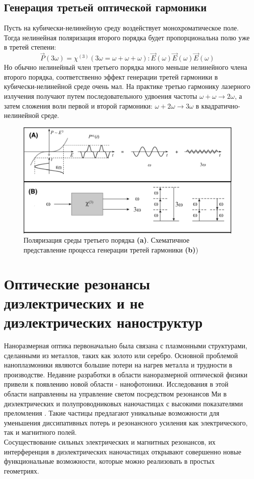 \subsection*{Генерация третьей оптической гармоники} 
Пусть на кубически-нелинейную среду воздействует монохроматическое поле. Тогда нелинейная поляризация второго порядка будет пропорциональна полю уже в третей степени:
\begin{equation}\label{thg2}
\vec{P}(3\omega) = \chi^{(3)}(3\omega = \omega + \omega + \omega):\vec{E}(\omega)\vec{E} (\omega)\vec{E} (\omega)
\end{equation}
Но обычно нелинейный член третьего порядка много меньше нелинейного члена второго порядка, соответственно  эффект генерации третей гармоники в кубически-нелинейной среде очень мал. На практике третью гармонику лазерного излучения получают путем последовательного удвоения частоты $\omega +  \omega \rightarrow 2\omega$, а затем сложения волн первой и второй гармоники: $\omega +  2\omega \rightarrow 3\omega$ в квадратично-нелинейной среде.
\begin{figure}[h]
	\centering
	\includegraphics[width=0.4\linewidth]{images/thg.png}
	\caption{Поляризация среды третьего порядка \textbf{(a)}. Схематичное представление процесса генерации третей гармоники \textbf{(b)}) \cite{mifi2015}}
	\label{thg12}
\end{figure}

\section{Оптические резонансы диэлектрических и не диэлектрических наноструктур}
\hspace*{2mm}
Наноразмерная оптика первоначально была связана с плазмонными структурами, сделанными из металлов, таких как золото или серебро. Основной проблемой наноплазмоники являются большие потери на нагрев металла и трудности в производстве. Недавние разработки в области наноразмерной оптической физики привели к появлению новой области -  нанофотоники. Исследования в этой области направленны на управление светом посредством резонансов Ми в диэлектрических и полупроводниковых наночастицах с высокими показателями преломления \cite{kuznetsov2016optically}. Такие частицы предлагают уникальные возможности для уменьшения диссипативных потерь и резонансного усиления как электрического, так и магнитного полей. 
\\
\hspace*{2mm}
Сосуществование сильных электрических и магнитных резонансов, их интерференция в диэлектрических наночастицах открывают совершенно новые функциональные возможности, которые можно реализовать в простых геометриях. 

